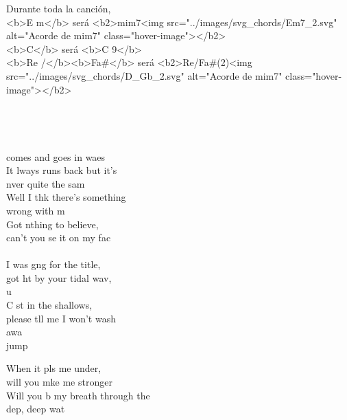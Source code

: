 \begin{cancion}%
Durante toda la canción, \\
<b>E m</b> será <b2>mim7<img src="../images/svg_chords/Em7_2.svg" alt="Acorde de mim7" class="hover-image"></b2>\\
<b>C</b>  será <b>C 9</b>\\
<b>Re /</b><b>Fa#</b> será <b2>Re/Fa#(2)<img src="../images/svg_chords/D_Gb_2.svg" alt="Acorde de mim7" class="hover-image"></b2>\\
	\jump\\
	\jump\\
{}\vspace*{-0.4cm}\\
	           \\
	 comes and goes in waes\\
	It lways runs back but it's \\
	nver quite the sam\\
	Well I thk there's something \\
	wrong with m\\
	Got nthing to believe, \\
	can't you se it on my fac\\
	\jump\\
	I was gng for the title, \\
	got ht by your tidal wav, \\
	u\\
	C st in the shallows, \\
	please tll me I won't wash\\
	 awa  \\jump\\
	\begin{chorus}%
	When it pls me under, \\
	will you mke me stronger\\
	Will you b my breath through the \\
	dep, deep wat\\

\end{chorus}
\end{cancion}
